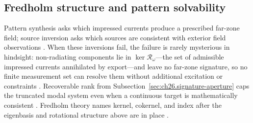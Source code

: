 \subsection{Fredholm structure and pattern solvability}
\label{sec:ch263}
Pattern synthesis asks which impressed currents produce a prescribed far-zone field; source
inversion asks which sources are consistent with exterior field observations
\cite{harrington2001,stratton1941}. When these inversions fail, the
failure is rarely mysterious in hindsight: non-radiating components lie in
$\ker\mathcal{R}_\omega$---the set of admissible impressed currents annihilated by export---and
leave no far-zone signature, so no finite measurement set can resolve them without additional
excitation or constraints \cite{devaney2004}. Recoverable rank from
Subsection~\ref{sec:ch26.signature-aperture} caps the truncated modal system even when a
continuous target is mathematically consistent \cite{hansen1988}. Fredholm theory names
kernel, cokernel, and index after the eigenbasis and rotational structure above are in place
\cite{stratton1941}.

